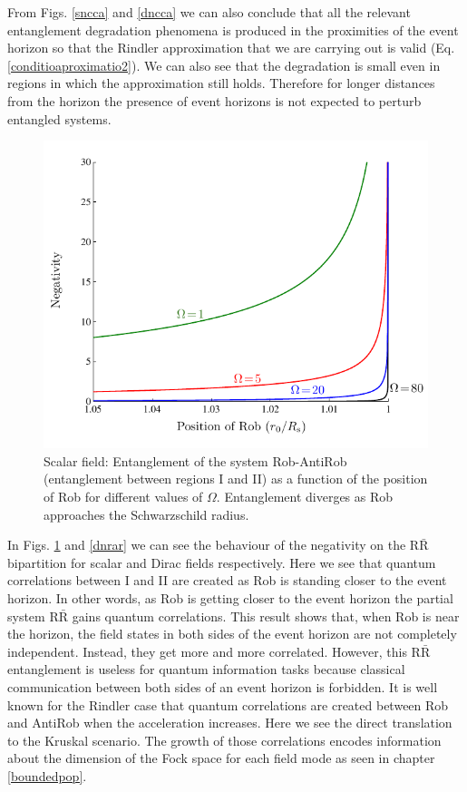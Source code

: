 From Figs. \ref{sncca} and \ref{dncca} we can also conclude that all the
relevant entanglement degradation phenomena is produced in the
proximities of the event horizon so that the Rindler approximation that
we are carrying out is valid  (Eq. \ref{conditioaproximatio2}). We can also
see that the degradation is small even in regions in which the
approximation  still holds. Therefore for longer distances from the
horizon the presence of event horizons is not expected to perturb
entangled systems.

\begin{figure}[h]
\begin{center}
\includegraphics[width=.85\textwidth]{rarboslm}
\caption{Scalar field: Entanglement of the system Rob-AntiRob
(entanglement between regions I and II) as a function of the position of
Rob for different values of $\Omega$. Entanglement diverges as Rob
approaches   the Schwarzschild radius.}
\label{snrar}
\end{center}
\end{figure}

In Figs. \ref{snrar} and \ref{dnrar} we can see the behaviour of the
negativity on the $\text{R}\bar{\text{R}}$ bipartition for scalar and
Dirac fields respectively. Here we see that quantum correlations between I and II are created as Rob is standing closer to the event horizon. In
other words,  as Rob is getting closer to the event horizon the partial
system $\text{R}\bar{\text{R}}$ gains quantum correlations. This result
shows that, when Rob is near the horizon, the field states in both sides of
the event horizon are not completely independent. Instead, they get more
and more correlated. However, this $\text{R}\bar{\text{R}}$
entanglement is useless for quantum information tasks because classical
communication between both sides of an event horizon is forbidden. It is
well known for the Rindler case that quantum correlations are created
between Rob and AntiRob when the acceleration increases.
Here we see the direct translation to the Kruskal scenario. The growth of
those correlations encodes information about the dimension of the Fock
space for each field mode as seen in chapter \ref{boundedpop}.



